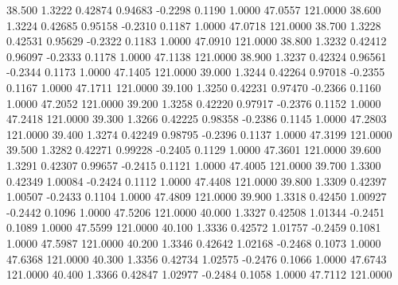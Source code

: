   38.500   1.3222   0.42874   0.94683  -0.2298   0.1190   1.0000  47.0557 121.0000
  38.600   1.3224   0.42685   0.95158  -0.2310   0.1187   1.0000  47.0718 121.0000
  38.700   1.3228   0.42531   0.95629  -0.2322   0.1183   1.0000  47.0910 121.0000
  38.800   1.3232   0.42412   0.96097  -0.2333   0.1178   1.0000  47.1138 121.0000
  38.900   1.3237   0.42324   0.96561  -0.2344   0.1173   1.0000  47.1405 121.0000
  39.000   1.3244   0.42264   0.97018  -0.2355   0.1167   1.0000  47.1711 121.0000
  39.100   1.3250   0.42231   0.97470  -0.2366   0.1160   1.0000  47.2052 121.0000
  39.200   1.3258   0.42220   0.97917  -0.2376   0.1152   1.0000  47.2418 121.0000
  39.300   1.3266   0.42225   0.98358  -0.2386   0.1145   1.0000  47.2803 121.0000
  39.400   1.3274   0.42249   0.98795  -0.2396   0.1137   1.0000  47.3199 121.0000
  39.500   1.3282   0.42271   0.99228  -0.2405   0.1129   1.0000  47.3601 121.0000
  39.600   1.3291   0.42307   0.99657  -0.2415   0.1121   1.0000  47.4005 121.0000
  39.700   1.3300   0.42349   1.00084  -0.2424   0.1112   1.0000  47.4408 121.0000
  39.800   1.3309   0.42397   1.00507  -0.2433   0.1104   1.0000  47.4809 121.0000
  39.900   1.3318   0.42450   1.00927  -0.2442   0.1096   1.0000  47.5206 121.0000
  40.000   1.3327   0.42508   1.01344  -0.2451   0.1089   1.0000  47.5599 121.0000
  40.100   1.3336   0.42572   1.01757  -0.2459   0.1081   1.0000  47.5987 121.0000
  40.200   1.3346   0.42642   1.02168  -0.2468   0.1073   1.0000  47.6368 121.0000
  40.300   1.3356   0.42734   1.02575  -0.2476   0.1066   1.0000  47.6743 121.0000
  40.400   1.3366   0.42847   1.02977  -0.2484   0.1058   1.0000  47.7112 121.0000
